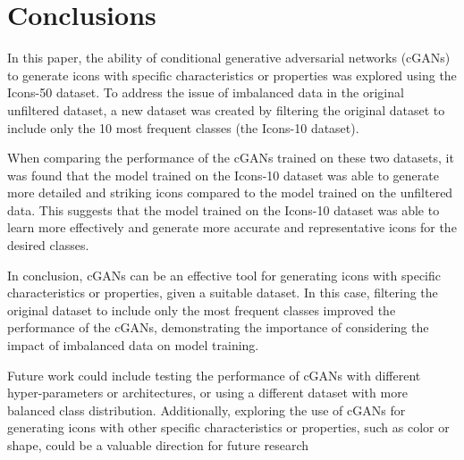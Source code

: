 \documentclass[conference]{IEEEtran}
\begin{document}
\section{Conclusions}
In this paper, the ability of conditional generative adversarial networks (cGANs) to generate icons with specific characteristics or properties was explored using the Icons-50 dataset. To address the issue of imbalanced data in the original unfiltered dataset, a new dataset was created by filtering the original dataset to include only the 10 most frequent classes (the Icons-10 dataset). 

When comparing the performance of the cGANs trained on these two datasets, it was found that the model trained on the Icons-10 dataset was able to generate more detailed and striking icons compared to the model trained on the unfiltered data. This suggests that the model trained on the Icons-10 dataset was able to learn more effectively and generate more accurate and representative icons for the desired classes.

In conclusion, cGANs can be an effective tool for generating icons with specific characteristics or properties, given a suitable dataset. In this case, filtering the original dataset to include only the most frequent classes improved the performance of the cGANs, demonstrating the importance of considering the impact of imbalanced data on model training. 

Future work could include testing the performance of cGANs with different hyper-parameters or architectures, or using a different dataset with more balanced class distribution. Additionally, exploring the use of cGANs for generating icons with other specific characteristics or properties, such as color or shape, could be a valuable direction for future research



\end{document}
